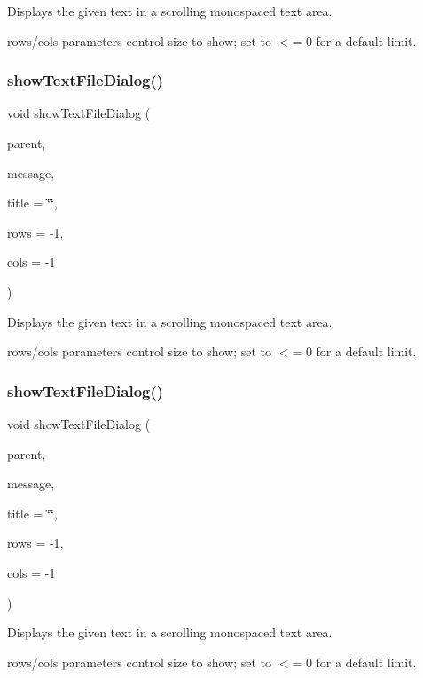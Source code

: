 Displays the given text in a scrolling monospaced text area. 

rows/cols parameters control size to show; set to $<$= 0 for a default limit. \mbox{\label{classGOptionPane_a7e1e9057ebd16b8769a93dba306a9f55}} 
\subsubsection{\texorpdfstring{show\+Text\+File\+Dialog()}{showTextFileDialog()}\hspace{0.1cm}{\footnotesize\ttfamily [2/3]}}
{\footnotesize\ttfamily void show\+Text\+File\+Dialog (\begin{DoxyParamCaption}\item[{\mbox{\hyperlink{classGWindow}{G\+Window}} $\ast$}]{parent,  }\item[{const std\+::string \&}]{message,  }\item[{const std\+::string \&}]{title = {\ttfamily \char`\"{}\char`\"{}},  }\item[{int}]{rows = {\ttfamily -\/1},  }\item[{int}]{cols = {\ttfamily -\/1} }\end{DoxyParamCaption})\hspace{0.3cm}{\ttfamily [static]}}



Displays the given text in a scrolling monospaced text area. 

rows/cols parameters control size to show; set to $<$= 0 for a default limit. \mbox{\label{classGOptionPane_a684cc543d7d7cb206355b534e261d0c9}} 
\subsubsection{\texorpdfstring{show\+Text\+File\+Dialog()}{showTextFileDialog()}\hspace{0.1cm}{\footnotesize\ttfamily [3/3]}}
{\footnotesize\ttfamily void show\+Text\+File\+Dialog (\begin{DoxyParamCaption}\item[{Q\+Widget $\ast$}]{parent,  }\item[{const std\+::string \&}]{message,  }\item[{const std\+::string \&}]{title = {\ttfamily \char`\"{}\char`\"{}},  }\item[{int}]{rows = {\ttfamily -\/1},  }\item[{int}]{cols = {\ttfamily -\/1} }\end{DoxyParamCaption})\hspace{0.3cm}{\ttfamily [static]}}



Displays the given text in a scrolling monospaced text area. 

rows/cols parameters control size to show; set to $<$= 0 for a default limit. 